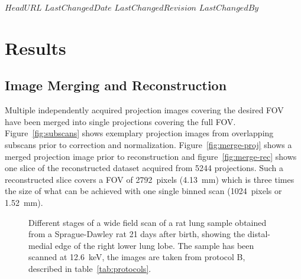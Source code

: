 \svnidlong
{$HeadURL$}
{$LastChangedDate$}
{$LastChangedRevision$}
{$LastChangedBy$}

\ifhtml
\else
\begin{center}
\end{center}
\fi

\section{Results}
\label{sec:Results}
\subsection{Image Merging and Reconstruction}
\label{sec:Image Merging and Reconstruction}
Multiple independently acquired projection images covering the desired FOV have been merged into single projections covering the full FOV. Figure~\ref{fig:subscans} shows exemplary projection images from overlapping subscans prior to correction and normalization. Figure~\ref{fig:merge-proj} shows a merged projection image prior to reconstruction and figure~\ref{fig:merge-rec} shows one slice of the reconstructed dataset acquired from 5244 projections. Such a reconstructed slice covers a FOV of \SI{2792}{pixels} (\SI{4.13}{\milli\meter}) which is three times the size of what can be achieved with one single binned scan (\SI{1024}{pixels} or \SI{1.52}{\milli\meter}). %

\cbstart
\begin{figure}
	
	\caption{Different stages of a wide field scan of a rat lung sample obtained from a Sprague-Dawley rat 21 days after birth, showing the distal-medial edge of the right lower lung lobe. The sample has been scanned at \SI{12.6}{\kilo\electronvolt}, the images are taken from protocol B, described in table~\ref{tab:protocols}.}
	\label{fig:wide field scan results}	
\end{figure}
\cbend

